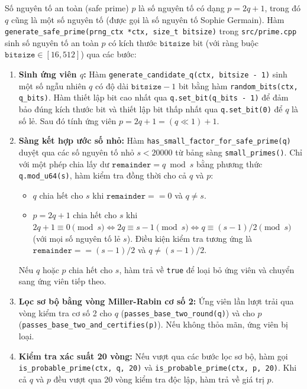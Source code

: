 Số nguyên tố an toàn (safe prime) $p$ là số nguyên tố có dạng $p = 2q + 1$, trong đó $q$ cũng là một số nguyên tố (được gọi là số nguyên tố Sophie Germain). Hàm \texttt{generate\_\allowbreak{}safe\_\allowbreak{}prime(prng\_\allowbreak{}ctx *ctx, size\_\allowbreak{}t bitsize)} trong \texttt{src/prime.cpp} sinh số nguyên tố an toàn $p$ có kích thước $\texttt{bitsize}$ bit (với ràng buộc $\texttt{bitsize} \in [16, 512]$) qua các bước:
\begin{enumerate}
    \item \textbf{Sinh ứng viên $q$:} Hàm \texttt{generate\_\allowbreak{}candidate\_\allowbreak{}q(ctx, bitsize - 1)} sinh một số ngẫu nhiên $q$ có độ dài $\texttt{bitsize} - 1$ bit bằng hàm \texttt{random\_\allowbreak{}bits(ctx, q\_\allowbreak{}bits)}. Hàm thiết lập bit cao nhất qua \texttt{q.set\_\allowbreak{}bit(q\_\allowbreak{}bits - 1)} để đảm bảo đúng kích thước bit và thiết lập bit thấp nhất qua \texttt{q.set\_\allowbreak{}bit(0)} để $q$ là số lẻ. Sau đó tính ứng viên $p = 2q + 1 = (q \ll 1) + 1$.
    \item \textbf{Sàng kết hợp ước số nhỏ:} Hàm \texttt{has\_\allowbreak{}small\_\allowbreak{}factor\_\allowbreak{}for\_\allowbreak{}safe\_\allowbreak{}prime(q)} duyệt qua các số nguyên tố nhỏ $s < 20000$ từ bảng sàng \texttt{small\_\allowbreak{}primes()}. Chỉ với một phép chia lấy dư $\texttt{remainder} = q \bmod s$ bằng phương thức \texttt{q.mod\_\allowbreak{}u64(s)}, hàm kiểm tra đồng thời cho cả $q$ và $p$:
    \begin{itemize}
        \item $q$ chia hết cho $s$ khi $\texttt{remainder} == 0$ và $q \neq s$.
        \item $p = 2q + 1$ chia hết cho $s$ khi $2q + 1 \equiv 0 \pmod s \iff 2q \equiv s - 1 \pmod s \iff q \equiv (s - 1)/2 \pmod s$ (với mọi số nguyên tố lẻ $s$). Điều kiện kiểm tra tương ứng là $\texttt{remainder} == (s - 1)/2$ và $q \neq (s - 1)/2$.
    \end{itemize}
    Nếu $q$ hoặc $p$ chia hết cho $s$, hàm trả về \texttt{true} để loại bỏ ứng viên và chuyển sang ứng viên tiếp theo.
    \item \textbf{Lọc sơ bộ bằng vòng Miller-Rabin cơ số 2:} Ứng viên lần lượt trải qua vòng kiểm tra cơ số 2 cho $q$ (\texttt{passes\_\allowbreak{}base\_\allowbreak{}two\_\allowbreak{}round(q)}) và cho $p$ (\texttt{passes\_\allowbreak{}base\_\allowbreak{}two\_\allowbreak{}and\_\allowbreak{}certifies(p)}). Nếu không thỏa mãn, ứng viên bị loại.
    \item \textbf{Kiểm tra xác suất 20 vòng:} Nếu vượt qua các bước lọc sơ bộ, hàm gọi \texttt{is\_\allowbreak{}probable\_\allowbreak{}prime(ctx, q, 20)} và \texttt{is\_\allowbreak{}probable\_\allowbreak{}prime(ctx, p, 20)}. Khi cả $q$ và $p$ đều vượt qua 20 vòng kiểm tra độc lập, hàm trả về giá trị $p$.
\end{enumerate}

